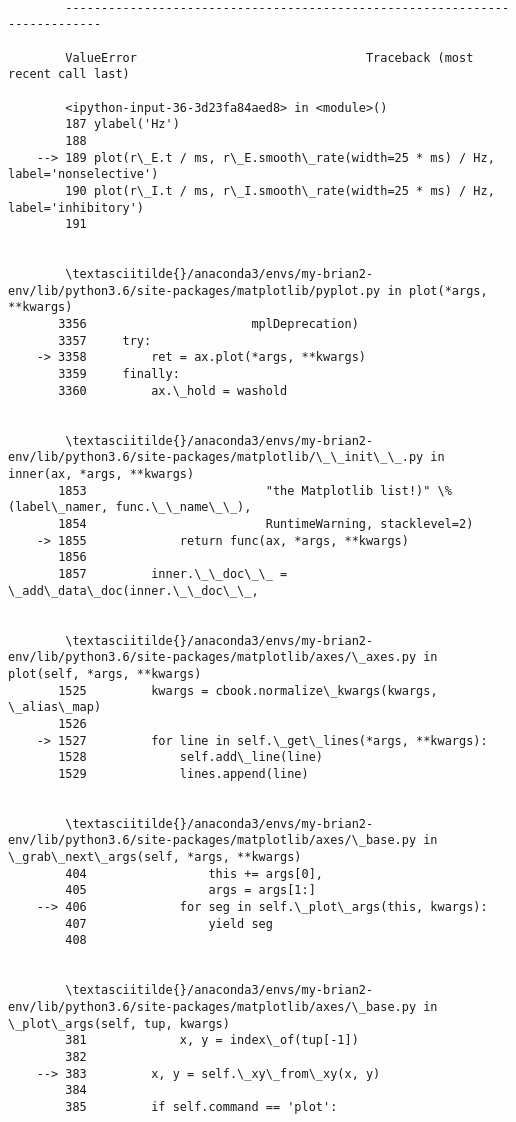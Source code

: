 \documentclass[11pt]{article}
\begin{document}
    \begin{Verbatim}[commandchars=\\\{\}]

        ---------------------------------------------------------------------------

        ValueError                                Traceback (most recent call last)

        <ipython-input-36-3d23fa84aed8> in <module>()
        187 ylabel('Hz')
        188 
    --> 189 plot(r\_E.t / ms, r\_E.smooth\_rate(width=25 * ms) / Hz, label='nonselective')
        190 plot(r\_I.t / ms, r\_I.smooth\_rate(width=25 * ms) / Hz, label='inhibitory')
        191 


        \textasciitilde{}/anaconda3/envs/my-brian2-env/lib/python3.6/site-packages/matplotlib/pyplot.py in plot(*args, **kwargs)
       3356                       mplDeprecation)
       3357     try:
    -> 3358         ret = ax.plot(*args, **kwargs)
       3359     finally:
       3360         ax.\_hold = washold


        \textasciitilde{}/anaconda3/envs/my-brian2-env/lib/python3.6/site-packages/matplotlib/\_\_init\_\_.py in inner(ax, *args, **kwargs)
       1853                         "the Matplotlib list!)" \% (label\_namer, func.\_\_name\_\_),
       1854                         RuntimeWarning, stacklevel=2)
    -> 1855             return func(ax, *args, **kwargs)
       1856 
       1857         inner.\_\_doc\_\_ = \_add\_data\_doc(inner.\_\_doc\_\_,


        \textasciitilde{}/anaconda3/envs/my-brian2-env/lib/python3.6/site-packages/matplotlib/axes/\_axes.py in plot(self, *args, **kwargs)
       1525         kwargs = cbook.normalize\_kwargs(kwargs, \_alias\_map)
       1526 
    -> 1527         for line in self.\_get\_lines(*args, **kwargs):
       1528             self.add\_line(line)
       1529             lines.append(line)


        \textasciitilde{}/anaconda3/envs/my-brian2-env/lib/python3.6/site-packages/matplotlib/axes/\_base.py in \_grab\_next\_args(self, *args, **kwargs)
        404                 this += args[0],
        405                 args = args[1:]
    --> 406             for seg in self.\_plot\_args(this, kwargs):
        407                 yield seg
        408 


        \textasciitilde{}/anaconda3/envs/my-brian2-env/lib/python3.6/site-packages/matplotlib/axes/\_base.py in \_plot\_args(self, tup, kwargs)
        381             x, y = index\_of(tup[-1])
        382 
    --> 383         x, y = self.\_xy\_from\_xy(x, y)
        384 
        385         if self.command == 'plot':



\end{Verbatim}
\end{document}
